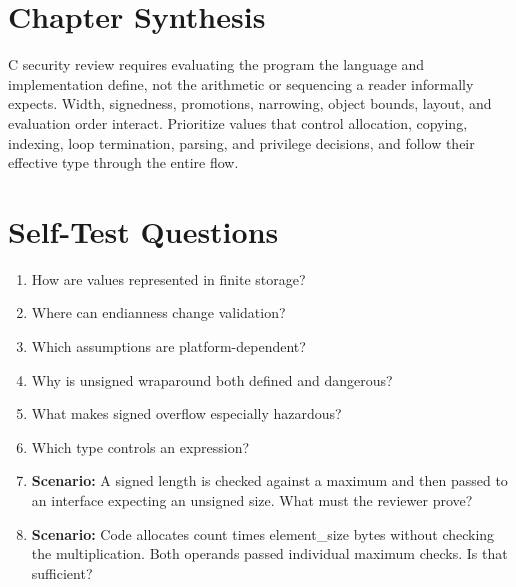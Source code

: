 \documentclass[11pt,letterpaper]{article}
\begin{document}
\section{Chapter Synthesis}
C security review requires evaluating the program the language and implementation define, not the arithmetic or sequencing a reader informally expects. Width, signedness, promotions, narrowing, object bounds, layout, and evaluation order interact. Prioritize values that control allocation, copying, indexing, loop termination, parsing, and privilege decisions, and follow their effective type through the entire flow.
\section{Self-Test Questions}
\begin{enumerate}
\item How are values represented in finite storage?
\item Where can endianness change validation?
\item Which assumptions are platform-dependent?
\item Why is unsigned wraparound both defined and dangerous?
\item What makes signed overflow especially hazardous?
\item Which type controls an expression?
\item \textbf{Scenario:} A signed length is checked against a maximum and then passed to an interface expecting an unsigned size. What must the reviewer prove?
\item \textbf{Scenario:} Code allocates count times element\_size bytes without checking the multiplication. Both operands passed individual maximum checks. Is that sufficient?
\end{enumerate}
\clearpage
\end{document}
